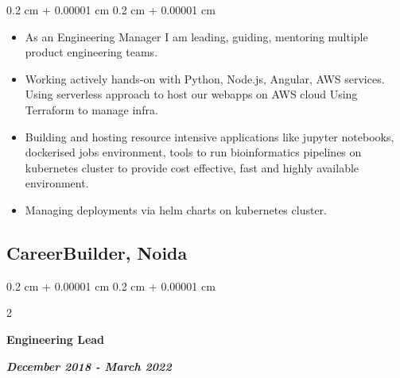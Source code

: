 \documentclass[10pt, letterpaper]{article}
\newenvironment{highlights}{
    \begin{itemize}[
        topsep=0.10 cm,
        parsep=0.10 cm,
        partopsep=0pt,
        itemsep=0pt,
        leftmargin=0.4 cm + 10pt
    ]
}{
    \end{itemize}
} %
\newenvironment{onecolentry}{
    \begin{adjustwidth}{
        0.2 cm + 0.00001 cm
    }{
        0.2 cm + 0.00001 cm
    }
}{
    \end{adjustwidth}
} %
\newenvironment{twocolentry}[2][]{
    \onecolentry
    \def\secondColumn{#2}
    \setcolumnwidth{\fill, 6.0 cm}
    \begin{paracol}{2}
}{
    \switchcolumn \raggedleft \secondColumn
    \end{paracol}
    \endonecolentry
} %
\begin{document}
            \vspace{0.10 cm}
            
            \begin{onecolentry}
                \begin{highlights}
                    \item As an Engineering Manager I am leading, guiding, mentoring multiple product engineering teams.
                    \item Working actively hands-on with Python, Node.js, Angular, AWS services. Using serverless approach to
                    host our webapps on AWS cloud Using Terraform to manage infra.
                    \item Building and hosting resource intensive applications like jupyter notebooks, dockerised jobs
                    environment, tools to run bioinformatics pipelines on kubernetes cluster to provide cost effective, fast
                    and highly available environment.
                    \item Managing deployments via helm charts on kubernetes cluster.
                \end{highlights}
            \end{onecolentry}
        

        \subsection{CareerBuilder, Noida}
            \begin{twocolentry}{  
                \textit{\textbf{December 2018 - March 2022}}}
                \textbf{Engineering Lead}
            \end{twocolentry}

            \vspace{0.10 cm}
            
\end{document}
